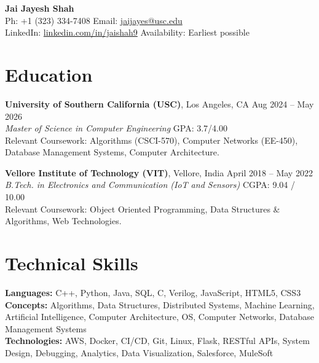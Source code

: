 \documentclass[letterpaper,10pt]{article}
\begin{document}
\begin{center}
    {\LARGE \textbf{Jai Jayesh Shah}} \\
    \vspace{2pt}
    \small
    Ph: +1 (323) 334-7408 \quad Email: \href{mailto:jaijayes@usc.edu}{jaijayes@usc.edu} \\
    LinkedIn: \href{https://www.linkedin.com/in/jaishah9}{linkedin.com/in/jaishah9} \quad Availability: Earliest possible \\
    \vspace{-8pt}
\end{center}

\section*{Education}
\textbf{University of Southern California (USC)}, Los Angeles, CA \hfill Aug 2024 -- May 2026 \\
\textit{Master of Science in Computer Engineering} \hfill GPA: 3.7/4.00 \\
Relevant Coursework: Algorithms (CSCI-570), Computer Networks (EE-450), Database Management Systems, Computer Architecture.

\vspace{1pt}

\textbf{Vellore Institute of Technology (VIT)}, Vellore, India \hfill April 2018 -- May 2022 \\
\textit{B.Tech. in Electronics and Communication (IoT and Sensors)} \hfill CGPA: 9.04 / 10.00 \\
Relevant Coursework: Object Oriented Programming, Data Structures \& Algorithms, Web Technologies.

\section*{Technical Skills}
\textbf{Languages:} C++, Python, Java, SQL, C, Verilog, JavaScript, HTML5, CSS3 \\
\textbf{Concepts:} Algorithms, Data Structures, Distributed Systems, Machine Learning, Artificial Intelligence, Computer Architecture, OS, Computer Networks, Database Management Systems \\
\textbf{Technologies:} AWS, Docker, CI/CD, Git, Linux, Flask, RESTful APIs, System Design, Debugging, Analytics, Data Visualization, Salesforce, MuleSoft

\end{document}
